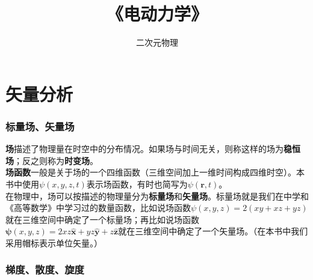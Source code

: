 \documentclass[12pt,a4paper]{ctexart}
\title{\Huge 《电动力学》}
\author{\Huge 二次元物理}%
\renewcommand*{\bf}[1]{\boldsymbol{#1}}
\newcommand*{\hatbf}[1]{\hat{\bf{#1}}}
\numberwithin{equation}{section}
\begin{document}
\maketitle
\tableofcontents

\newpage

    \part{矢量分析}
        \section{标量场、矢量场}
        \textbf{场}描述了物理量在时空中的分布情况。如果场与时间无关，则称这样的场为\textbf{稳恒场}；反之则称为\textbf{时变场}。\\
        \textbf{场函数}一般是关于场的一个四维函数（三维空间加上一维时间构成四维时空）。本书中使用$\psi(x,y,z,t)$表示场函数，有时也简写为$\psi(\bf{r},t)$。\\
        在物理中，场可以按描述的物理量分为\textbf{标量场}和\textbf{矢量场}。标量场就是我们在中学和《高等数学》中学习过的数量函数，比如说场函数$\psi(x,y,z) = 2(xy + xz + yz)$就在三维空间中确定了一个标量场；再比如说场函数$\bf{\psi}(x,y,z) = 2xz\hatbf{x} + yz\hatbf{y} + z\hatbf{z}$就在三维空间中确定了一个矢量场。（在本书中我们采用帽标$\hat{}$表示单位矢量。）

        \section{梯度、散度、旋度}
\end{document}

